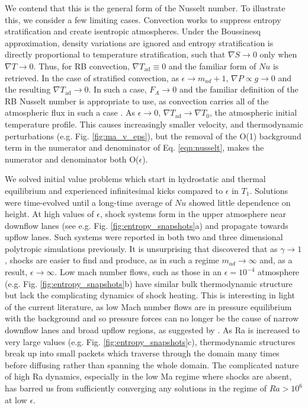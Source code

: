 \documentclass[aps, prl, twocolumn, groupedaddress, amsfonts, amssymb, amsmath]{revtex4-1}
\newcommand{\grad}{\ensuremath{\nabla}}
\begin{document}
We contend that this is the general form of the Nusselt number.  To illustrate this, we consider a few limiting
cases. Convection works to
suppress entropy stratification and create isentropic atmospheres.  Under the Boussinesq approximation,
density variations are ignored and entropy stratification is directly proportional to temperature stratification,
such that $\grad S \rightarrow 0$ only when $\grad T \rightarrow 0$.  Thus, for RB convection, 
$\grad T_{\text{ad}} \equiv 0$ and the familiar form of $Nu$ is retrieved.  In the case of stratified convection,
as $\epsilon \rightarrow m_{ad} + 1$, $\grad P \propto g \rightarrow 0$ and
the resulting $\grad T_{\text{ad}} \rightarrow 0$.  In such a case, $F_A \rightarrow 0$ and the familiar
definition of the RB Nusselt number is appropriate to use, as convection carries all of the
atmospheric flux in such a case \cite{brandenburg&all2005}. As $\epsilon \rightarrow 0$, 
$\grad T_{\text{ad}}\rightarrow \grad T_0$, the atmospheric initial temperature profile.  This causes increasingly
smaller velocity, and thermodynamic perturbations (e.g. Fig. \ref{fig:ma_v_eps}), but the removal of the 
O(1) background term in the numerator and denominator of Eq. \ref{eqn:nusselt}, makes the numerator and
denominator both O($\epsilon$).

We solved initial value problems which start in hydrostatic and thermal equilibrium and experienced infinitesimal 
kicks compared to $\epsilon$ in $T_1$.  Solutions were time-evolved until a long-time average of $Nu$ showed little
dependence on height. At
high values of $\epsilon$, shock systems form in the upper atmosphere near downflow lanes 
(see e.g. Fig. \ref{fig:entropy_snapshots}a) and propagate towards upflow lanes.  Such systems were reported in
both two \cite{cattaneo&all1990} and three \cite{malagoli&all1990} dimensional polytropic simulations previously.
It is unsurprising that \cite{cattaneo&all1990} discovered that as $\gamma \rightarrow 1$, shocks are easier to
find and produce, as in such a regime $m_{ad} \rightarrow \infty$ and, as a result, $\epsilon \rightarrow \infty$.
Low mach number flows, such as those in an $\epsilon = 10^{-4}$ atmosphere (e.g. Fig. \ref{fig:entropy_snapshots}b)
have similar bulk thermodynamic structure but lack the complicating dynamics of shock heating. This is interesting
in light of the current literature, as low Mach number flows are in pressure equilibrium with the background and
so pressure forces can no longer be the cause of narrow downflow lanes and broad upflow regions, as suggested
by \cite{hurlburt&all1984}.  As Ra is
increased to very large values (e.g. Fig. \ref{fig:entropy_snapshots}c), thermodynamic structures 
break up into small packets which traverse through the domain many
times before diffusing rather than spanning the whole domain.  
The complicated nature of high Ra dynamics, especially in the low Ma regime where
shocks are absent, has barred us from sufficiently converging any solutions in the regime of $Ra > 10^6$
at low $\epsilon$.
\end{document}
